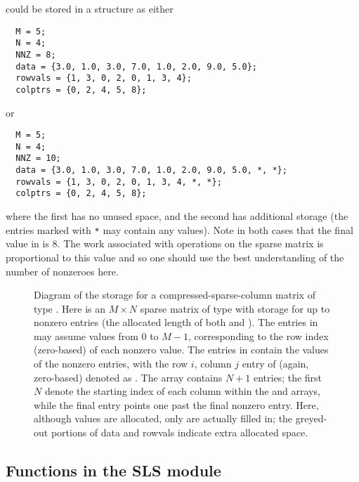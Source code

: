 could be stored in a  structure as either
\begin{verbatim}
  M = 5;
  N = 4;
  NNZ = 8;
  data = {3.0, 1.0, 3.0, 7.0, 1.0, 2.0, 9.0, 5.0};
  rowvals = {1, 3, 0, 2, 0, 1, 3, 4};
  colptrs = {0, 2, 4, 5, 8};
\end{verbatim}
or 
\begin{verbatim}
  M = 5;
  N = 4;
  NNZ = 10;
  data = {3.0, 1.0, 3.0, 7.0, 1.0, 2.0, 9.0, 5.0, *, *};
  rowvals = {1, 3, 0, 2, 0, 1, 3, 4, *, *};
  colptrs = {0, 2, 4, 5, 8};
\end{verbatim}
where the first has no unused space, and the second has additional
storage (the entries marked with \texttt{*} may contain any values).
Note in both cases that the final value in  is $8$.  The work 
associated with operations on the sparse matrix is proportional to this
value and so one should use the best understanding of the
number of nonzeroes here.
\begin{figure}
\centerline{}
\caption[Diagram of the storage for a compressed-sparse-column matrix
  of type ] 
  {Diagram of the storage for a compressed-sparse-column matrix of
  type . Here  is an $M \times N$ sparse matrix of
  type  with storage for up to  nonzero entries
  (the allocated length of both  and ).  The
  entries in  may assume values from $0$ to $M-1$,
  corresponding to the row index (zero-based) of each nonzero value.
  The entries in  contain the values of the nonzero entries,
  with the row $i$, column $j$ entry of  (again, zero-based)
  denoted as .  The  array contains $N+1$
  entries; the first $N$ denote the starting index of each column
  within the  and  arrays, while the final entry
  points one past the final nonzero entry.  Here, although 
  values are allocated, only  are actually filled in; the
  greyed-out portions of {\id data} and {\id rowvals} indicate extra
  allocated space.}\label{f:cscmat}
\end{figure}

\subsection{Functions in the SLS module}\label{ss:sls_functions}

